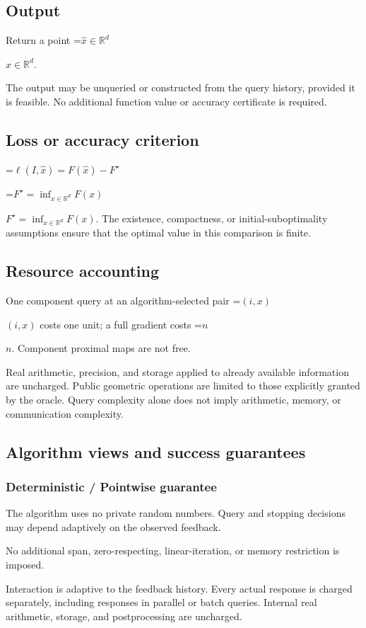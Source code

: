 \documentclass[10pt,a4paper]{article}
\newcommand{\AtlasMath}[1]{\par\begingroup\centering\setbox0=\hbox{$\displaystyle #1$}\ifdim\wd0>1.4\linewidth\typeout{ATLAS WIDE FORMULA: \the\wd0}\fi\ifdim\wd0>\linewidth\resizebox{\linewidth}{!}{\box0}\else\box0\fi\par\endgroup}
\newcommand{\AtlasInlineMath}[1]{\begingroup\setbox0=\hbox{$#1$}\ifdim\wd0>.4\linewidth\endgroup\AtlasMath{#1}\else\endgroup$#1$\fi}
\begin{document}
\subsection{Output}
Return a point \AtlasInlineMath{\widehat x\in\mathbb R^d}.

The output may be unqueried or constructed from the query history, provided it is feasible. No additional function value or accuracy certificate is required.

\subsection{Loss or accuracy criterion}

\AtlasMath{\ell(I,\widehat{x})=F(\widehat{x})-F^\star}


\AtlasInlineMath{F^\star=\inf_{x\in \mathbb{R}^d}F(x)}. The existence, compactness, or initial-suboptimality assumptions ensure that the optimal value in this comparison is finite.

\subsection{Resource accounting}
One component query at an algorithm-selected pair \AtlasInlineMath{(i,x)} costs one unit; a full gradient costs \AtlasInlineMath{n}. Component proximal maps are not free.

Real arithmetic, precision, and storage applied to already available information are uncharged. Public geometric operations are limited to those explicitly granted by the oracle. Query complexity alone does not imply arithmetic, memory, or communication complexity.

\subsection{Algorithm views and success guarantees}
\subsubsection{Deterministic / Pointwise guarantee}
The algorithm uses no private random numbers. Query and stopping decisions may depend adaptively on the observed feedback.

No additional span, zero-respecting, linear-iteration, or memory restriction is imposed.

Interaction is adaptive to the feedback history. Every actual response is charged separately, including responses in parallel or batch queries. Internal real arithmetic, storage, and postprocessing are uncharged.
\end{document}
